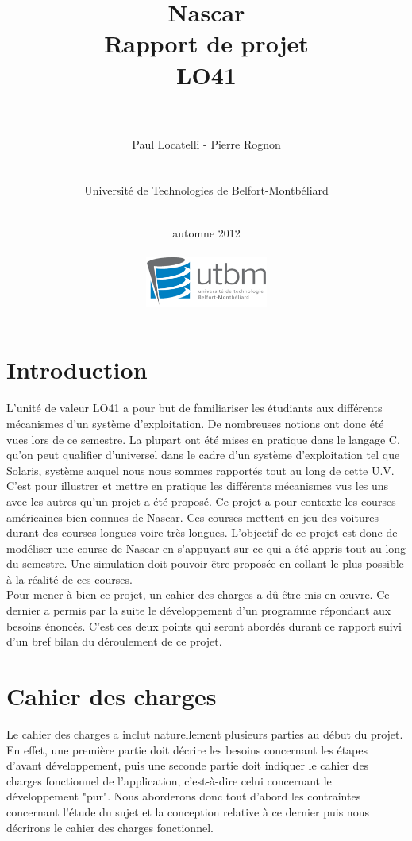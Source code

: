 \documentclass[a4paper, 11pt]{article}
\title{\vspace{5cm}Nascar \\ Rapport de projet \\ LO41 \\ \ \\}
\date{automne 2012\\ \ \\ \vspace*{3cm}
	\includegraphics[width=4cm]{logo_utbm.png}
	}
\author{Paul Locatelli - Pierre Rognon \\ \ \\ \ \\ Université de Technologies de Belfort-Montbéliard\\ \ \\}
\begin{document}
	
	\maketitle
	
	\newpage
	
	
	\newpage
	
	\section*{Introduction}
	
	L'unité de valeur LO41 a pour but de familiariser les étudiants aux différents mécanismes d'un système d'exploitation. De nombreuses notions ont donc été vues lors de ce semestre. La plupart ont été mises en pratique dans le langage C, qu'on peut qualifier d'universel dans le cadre d'un système d'exploitation tel que Solaris, système auquel nous nous sommes rapportés tout au long de cette U.V. C'est pour illustrer et mettre en pratique les différents mécanismes vus les uns avec les autres qu'un projet a été proposé. Ce projet a pour contexte les courses américaines bien connues de Nascar. Ces courses mettent en jeu des voitures durant des courses longues voire très longues. L'objectif de ce projet est donc de modéliser une course de Nascar en s'appuyant sur ce qui a été appris tout au long du semestre. Une simulation doit pouvoir être proposée en collant le plus possible à la réalité de ces courses. \\
	Pour mener à bien ce projet, un cahier des charges a dû être mis en œuvre. Ce dernier a permis par la suite le développement d'un programme répondant aux besoins énoncés. C'est ces deux points qui seront abordés durant ce rapport suivi d'un bref bilan du déroulement de ce projet.
	
	
	\newpage
	
	\section{Cahier des charges}
	
	Le cahier des charges a inclut naturellement plusieurs parties au début du projet. En effet, une première partie doit décrire les besoins concernant les étapes d'avant développement, puis une seconde partie doit indiquer le cahier des charges fonctionnel de l'application, c'est-à-dire celui concernant le développement "pur". Nous aborderons donc tout d'abord les contraintes concernant l'étude du sujet et la conception relative à ce dernier puis nous décrirons le cahier des charges fonctionnel.
	
\end{document}
